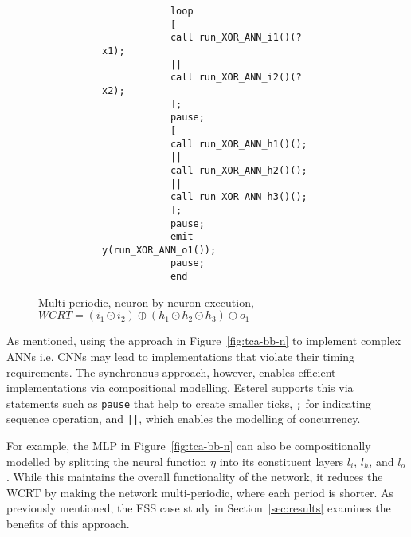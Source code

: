 \begin{figure}[h]
	\centering
	\vspace{5mm}
	\begin{subfigure}[h]{0.8\textwidth}
		\centering
		\begin{subfigure}[h]{0.3\textwidth}
			\centering
			
		\end{subfigure}%
		\begin{subfigure}[h]{0.66\textwidth}
			\begin{lstlisting}
			loop
			[
			call run_XOR_ANN_i1()(?x1);
			|| 
			call run_XOR_ANN_i2()(?x2);
			];
			pause;
			[
			call run_XOR_ANN_h1()();
			||
			call run_XOR_ANN_h2()();
			||
			call run_XOR_ANN_h3()();
			];
			pause;
			emit y(run_XOR_ANN_o1());
			pause;
			end
			\end{lstlisting}
		\end{subfigure}
	\end{subfigure}
\caption{Multi-periodic, neuron-by-neuron execution, $WCRT = \left(i_1 \odot i_2\right) \oplus \left(h_1 \odot h_2 \odot h_3\right) \oplus o_1$}
\label{fig:tcas-xor}
\end{figure}

As mentioned, using the approach in Figure~\ref{fig:tca-bb-n} to implement complex \acp{ANN} i.e. \acp{CNN} may lead to implementations that violate their timing requirements. 
The synchronous approach, however, enables efficient implementations via compositional modelling.
Esterel supports this via statements such as \texttt{pause} that help to create smaller ticks, \texttt{;} for indicating sequence operation, and \texttt{||}, which enables the modelling of concurrency. 

For example, the \ac{MLP} in Figure~\ref{fig:tca-bb-n} can also be
compositionally modelled by splitting the neural function $\eta$
into its constituent layers $l_i$, $l_h$, and $l_o$. 
While this maintains the overall functionality of the network, it
reduces the \ac{WCRT} by making the network multi-periodic, where each
period is shorter. 
As previously mentioned, the \ac{ESS} case study in Section~\ref{sec:results} examines the benefits of this approach.


